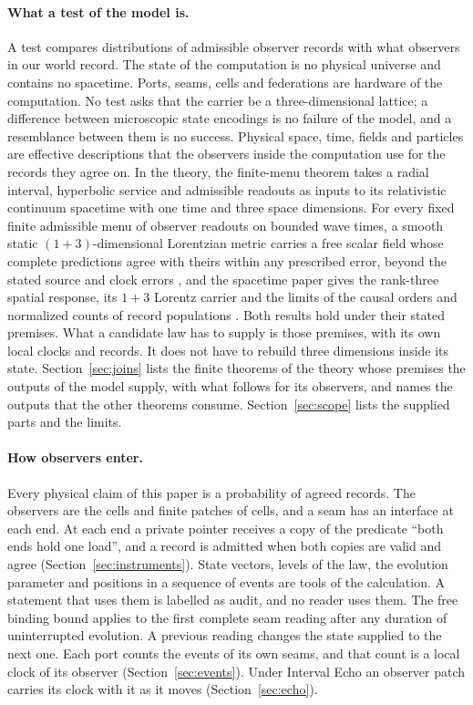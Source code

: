 \documentclass[11pt]{article}
\theoremstyle{definition}
\theoremstyle{remark}
\theoremstyle{plain}
\begin{document}
\paragraph{What a test of the model is.}
A test compares distributions of admissible observer records with what
observers in our world record. The state of the computation is no physical
universe and contains no spacetime. Ports, seams, cells and federations are
hardware of the computation. No test asks that the carrier be a
three-dimensional lattice; a difference between microscopic state encodings
is no failure of the model, and a resemblance between them is no success.
Physical space, time, fields and particles are effective descriptions that
the observers inside the computation use for the records they agree on. In
the theory, the finite-menu theorem takes a radial interval, hyperbolic service and admissible readouts as inputs to its relativistic continuum spacetime with one time and three
space dimensions. For every fixed finite admissible menu of observer
readouts on bounded wave times, a smooth static $(1+3)$-dimensional
Lorentzian metric carries a free scalar field whose complete predictions
agree with theirs within any prescribed error, beyond the stated source and
clock errors \cite{flagship}, and the
spacetime paper gives the rank-three spatial response, its $1+3$ Lorentz
carrier and the limits of the causal orders and normalized counts of record
populations \cite{ophspacetime}. Both results hold under their stated
premises. What a candidate law has to supply is those premises, with its
own local clocks and records. It does not have to rebuild three dimensions
inside its state. Section~\ref{sec:joins} lists the finite theorems of the
theory whose premises the outputs of the model supply, with what follows
for its observers, and names the outputs that the other theorems consume.
Section~\ref{sec:scope} lists the supplied parts and the limits.

\paragraph{How observers enter.}
Every physical claim of this paper is a probability of agreed records. The
observers are the cells and finite patches of cells, and a seam has an
interface at each end. At each end a private pointer receives a copy of the
predicate ``both ends hold one load'', and a record is admitted when both
copies are valid and agree (Section~\ref{sec:instruments}). State vectors,
levels of the law, the evolution parameter and positions in a sequence of
events are tools of the calculation. A statement that uses them is labelled as audit, and no reader
uses them. The free binding bound applies to the first complete seam
reading after any duration of uninterrupted evolution. A previous reading
changes the state supplied to the next one. Each port counts the events of its
own seams, and that count is a local clock of its observer
(Section~\ref{sec:events}). Under Interval Echo an observer patch carries
its clock with it as it moves (Section~\ref{sec:echo}).
\end{document}
